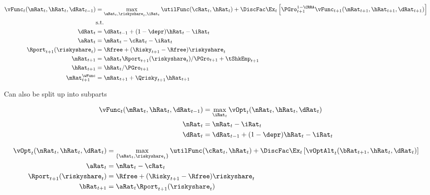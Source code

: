 \documentclass[PortfolioChoiceWithRiskyHousing]{subfiles}
\begin{document}
\begin{equation}
	\begin{split}
		\vFunc_{t}(\mRat_{t}, \hRat_{t}, \dRat_{t-1}) & = \max_{\aRat_{t}, \riskyshare_{t}, \iRat_{t}} \utilFunc(\cRat_{t}, \hRat_{t}) + \DiscFac \Ex_{t} \left[ \PGro_{t+1}^{1-\CRRA} \vFunc_{t+1}(\mRat_{t+1}, \hRat_{t+1}, \dRat_{t+1}) \right] \\
		&\text{s.t.} \\
		\dRat_{t} & = \dRat_{t-1} + (1-\depr)\hRat_{t} - \iRat_{t} \\
		\aRat_{t} & = \mRat_{t} - \cRat_{t} - \iRat_{t} \\
		\Rport_{t+1}(\riskyshare_{t}) & = \Rfree + (\Risky_{t+1} - \Rfree)\riskyshare_{t} \\
		\mRat_{t+1} & = \aRat_{t}\Rport_{t+1}(\riskyshare_{t})/\PGro_{t+1} + \tShkEmp_{t+1} \\
		\hRat_{t+1} & = \hRat_{t}/\PGro_{t+1} \\
		\mRat_{t+1}^{\wFunc} & = \mRat_{t+1} + \Qrisky_{t+1}\hRat_{t+1}
	\end{split}
\end{equation}

Can also be split up into subparts

\begin{equation}
	\begin{split}
		\vFunc_{t}(\mRat_{t}, \hRat_{t}, \dRat_{t-1}) & = \max_{\iRat_{t}} \vOpt_{t}(\nRat_{t}, \hRat_{t}, \dRat_{t}) \\
		\nRat_{t} & = \mRat_{t} - \iRat_{t} \\
		\dRat_{t} & = \dRat_{t-1} + (1-\depr)\hRat_{t} - \iRat_{t}
	\end{split}
\end{equation}

\begin{equation}
	\begin{split}
		\vOpt_{t}(\nRat_{t}, \hRat_{t}, \dRat_{t}) & = \max_{\{\aRat_{t}, \riskyshare_{t}\}} \utilFunc(\cRat_{t}, \hRat_{t}) + \DiscFac \Ex_{t}\left[ \vOptAlt_{t}(\bRat_{t+1}, \hRat_{t}, \dRat_{t}) \right] \\
		\aRat_{t} & = \nRat_{t} - \cRat_{t} \\
		\Rport_{t+1}(\riskyshare_{t}) & = \Rfree + (\Risky_{t+1} - \Rfree)\riskyshare_{t} \\
		\bRat_{t+1} & = \aRat_{t}\Rport_{t+1}(\riskyshare_{t})
	\end{split}
\end{equation}
\end{document}
